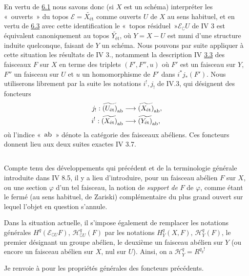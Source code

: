 \documentclass[10pt]{../fichiers-configuration-latex/smfart}
\begin{document}
En vertu de \hyperref[VIII.prop6.1]{6.1} nous savons donc (si $X$ est un
schéma) interpréter les « ouverts » du topos $ℰ =
\widetilde{X_{\text{ét}}}$ comme ouverts $U$ de $X$ au sens
habituel, et en vertu de \hyperref[VIII.thm6.3]{6.3} avec cette identification
le « topos résiduel »\pageoriginale $ℰ_\complement U$ de
IV 3 est équivalent canoniquement au topos
$\widetilde{Y_{\text{ét}}}$, où $Y = X - U$ est muni d'une structure
induite quelconque, faisant de $Y$ un schéma. Nous pouvons par suite
appliquer à cette situation les résultats de IV 3., notamment la
description IV \hyperref[VIII.def3.3]{3.3} des faisceaux $F$ sur $X$ en terme
des triplets $(F', F'', u)$ où $F'$ est un faisceau sur $Y$, $F''$
un faisceau sur $U$ et $u$ un homomorphisme de $F'$ dans $i^{\ast}
j_{\ast} (F')$. Nous utiliserons librement par la suite les
notations $i^{!}, j_{!}$ de IV.3, qui désignent des foncteurs
\begin{align*}
j_{!} : \widetilde{(U_{\text{ét}})}_{\ab} &\to
\widetilde{(X_{\text{ét}})}_{\ab}{\quoi},\\
i^{!} : \widetilde{(X_{\text{ét}})}_{\ab} &\to
\widetilde{(Y_{\text{ét}})}_{\ab}{\quoi},
\end{align*}
où l'indice « $\operatorname{ab}$ » dénote la catégorie des faisceaux
abéliens. Ces
foncteurs donnent lieu aux deux suites exactes IV 3.7.

\subsection{}

Compte tenu des développements qui précédent et de la terminologie
générale introduite dans IV 8.5, il y a lieu d'introduire, pour un
faisceau abélien $F$ sur $X$, ou une section $\varphi$ d'un tel
faisceau, la notion de \emph{support de} $F$ \resp de $\varphi$, comme
étant le fermé (au sens habituel, \ie de Zariski) complémentaire du
plus grand ouvert sur lequel l'objet en question s'annule.

Dans la situation actuelle, il s'impose également de remplacer les
notations générales  $H^q (ℰ_{\complement U} F)$,
$ℋ^q_{\complement U} (F)$ par les notations $H^{q}_Y (X, F)$,
$ℋ^{q}_Y (F)$, le premier désignant un groupe abélien, le deuxième
un faisceau abélien sur $Y$ (ou encore un faisceau abélien sur $X$,
nul sur $U$). Ainsi, on a $ℋ^{q}_Y  = R^{q_{y}!}$ \etc

Je renvoie à  pour les propriétés générales des foncteurs
précédents.
\end{document}
